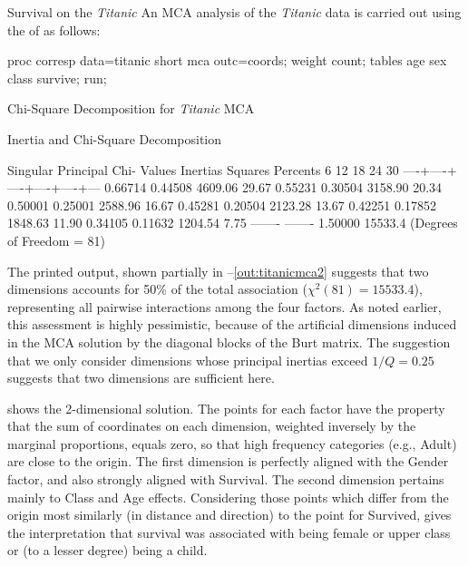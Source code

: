 \begin{Example}[titanic2]{Survival on the \emph{Titanic}}
An MCA analysis of the \emph{Titanic} data is carried out
using the  of  as follows:

\begin{listing}
proc corresp data=titanic short mca outc=coords;
   weight count;
   tables age sex class survive;
   run;
\end{listing}
\begin{Output}[htb]
\caption{Chi-Square Decomposition for \emph{Titanic} MCA}\label{out:titanicmca1}
\begin{output}
                      Inertia and Chi-Square Decomposition

        Singular  Principal Chi-
        Values    Inertias  Squares Percents    6   12   18   24   30
                                            ----+----+----+----+----+---
        0.66714   0.44508   4609.06  29.67%
        0.55231   0.30504   3158.90  20.34%
        0.50001   0.25001   2588.96  16.67%
        0.45281   0.20504   2123.28  13.67%
        0.42251   0.17852   1848.63  11.90%
        0.34105   0.11632   1204.54   7.75%
                  -------   -------
                  1.50000   15533.4 (Degrees of Freedom = 81)
\end{output}
\end{Output}
The printed output, shown partially in --\ref{out:titanicmca2}
suggests that two dimensions accounts for
50\% of the total association ($\chi^2 (81) = 15533.4$), representing
all pairwise interactions among the four factors.
As noted earlier, this assessment is highly pessimistic,
because of the artificial dimensions induced in the MCA solution
by the diagonal blocks of the Burt matrix.  The suggestion
\citep[p. 145]{Greenacre:84} that we only consider dimensions whose
principal inertias exceed $1/Q = 0.25$ suggests that two dimensions
are sufficient here.

 shows the 2-dimensional solution.
The points for each factor have the property that the sum of coordinates
on each dimension, weighted inversely by the marginal proportions, equals
zero, so that high frequency categories (e.g., Adult) are close to the origin.
The first dimension is perfectly aligned with the Gender factor, and also
strongly aligned with Survival.  The second dimension pertains mainly to
Class and Age effects.  Considering those points which differ from the
origin most similarly (in distance and direction) to the point for Survived,
gives the interpretation that survival was associated with being female
or upper class or (to a lesser degree) being a child.


\end{Example}
